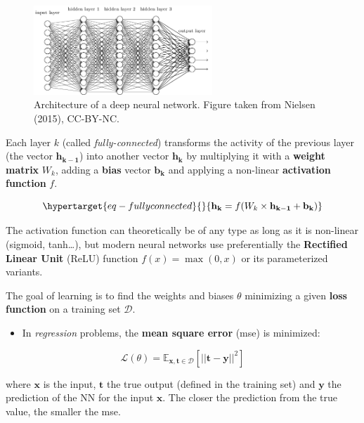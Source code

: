 \documentclass[
  letterpaper,
  DIV=11,
  numbers=noendperiod]{scrreprt}
\providecommand{\tightlist}{%
  \setlength{\itemsep}{0pt}\setlength{\parskip}{0pt}}\usepackage{longtable,booktabs,array}
\begin{document}
\begin{figure}

{\centering \includegraphics[width=0.6\textwidth,height=\textheight]{./img/dnn.png}

}

\caption{\label{fig-dnn}Architecture of a deep neural network. Figure
taken from Nielsen (2015), CC-BY-NC.}

\end{figure}

Each layer \(k\) (called \emph{fully-connected}) transforms the activity
of the previous layer (the vector \(\mathbf{h_{k-1}}\)) into another
vector \(\mathbf{h_{k}}\) by multiplying it with a \textbf{weight
matrix} \(W_k\), adding a \textbf{bias} vector \(\mathbf{b_k}\) and
applying a non-linear \textbf{activation function} \(f\).

\begin{equation}\protect\hypertarget{eq-fullyconnected}{}{
    \mathbf{h_{k}} = f(W_k \times \mathbf{h_{k-1}} + \mathbf{b_k})
}\label{eq-fullyconnected}\end{equation}

The activation function can theoretically be of any type as long as it
is non-linear (sigmoid, tanh\ldots), but modern neural networks use
preferentially the \textbf{Rectified Linear Unit} (ReLU) function
\(f(x) = \max(0, x)\) or its parameterized variants.

The goal of learning is to find the weights and biases \(\theta\)
minimizing a given \textbf{loss function} on a training set
\(\mathcal{D}\).

\begin{itemize}
\tightlist
\item
  In \emph{regression} problems, the \textbf{mean square error} (mse) is
  minimized:
\end{itemize}

\[
    \mathcal{L}(\theta) = \mathbb{E}_{\mathbf{x}, \mathbf{t} \in \mathcal{D}} [||\mathbf{t} - \mathbf{y}||^2]
\]

where \(\mathbf{x}\) is the input, \(\mathbf{t}\) the true output
(defined in the training set) and \(\mathbf{y}\) the prediction of the
NN for the input \(\mathbf{x}\). The closer the prediction from the true
value, the smaller the mse.
\end{document}

